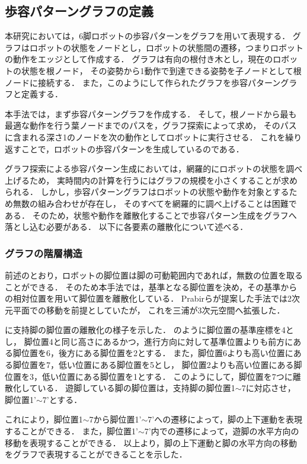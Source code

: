 \subsection{歩容パターングラフの定義}
本研究においては，6脚ロボットの歩容パターンをグラフを用いて表現する．
グラフはロボットの状態をノードとし，ロボットの状態間の遷移，つまりロボットの動作をエッジとして作成する．
グラフは有向の根付き木とし，現在のロボットの状態を根ノード，
その姿勢から1動作で到達できる姿勢を子ノードとして根ノードに接続する．
また，このようにして作られたグラフを歩容パターングラフと定義する．

本手法では，まず歩容パターングラフを作成する．
そして，根ノードから最も最適な動作を行う葉ノードまでのパスを，グラフ探索によって求め，
そのパスに含まれる深さ1のノードを次の動作としてロボットに実行させる．
これを繰り返すことで，ロボットの歩容パターンを生成しているのである．

グラフ探索による歩容パターン生成においては，網羅的にロボットの状態を調べ上げるため，
実時間内の計算を行うにはグラフの規模を小さくすることが求められる．
しかし，歩容パターングラフはロボットの状態や動作を対象とするため無数の組み合わせが存在し，
そのすべてを網羅的に調べ上げることは困難である．
そのため，状態や動作を離散化することで歩容パターン生成をグラフへ落とし込む必要がある．
以下に各要素の離散化について述べる．

\subsubsection{グラフの階層構造}
前述のとおり，ロボットの脚位置は脚の可動範囲内であれば，無数の位置を取ることができる．
そのため本手法では，基準となる脚位置を決め，その基準からの相対位置を用いて脚位置を離散化している．
Prabirらが提案した手法では2次元平面での移動を前提としていたが\cite{Prabir_Graph_search}，
これを三浦が3次元空間へ拡張した\cite{Miura_Graph_search}．

に支持脚の脚位置の離散化の様子を示した．
のように脚位置の基準座標を4とし，
脚位置4と同じ高さにあるかつ，進行方向に対して基準位置よりも前方にある脚位置を6，後方にある脚位置を2とする．
また，脚位置6よりも高い位置にある脚位置を7，低い位置にある脚位置を5とし，
脚位置2よりも高い位置にある脚位置を3，低い位置にある脚位置を1とする．
このようにして，脚位置を7つに離散化している．
遊脚している脚の脚位置は，支持脚の脚位置1$\sim$7に対応させ，脚位置1'$\sim$7'とする．%

これにより，脚位置1$\sim$7から脚位置1'$\sim$7'への遷移によって，脚の上下運動を表現することができる．
また，脚位置1'$\sim$7'内での遷移によって，遊脚の水平方向の移動を表現することができる．
以上より，脚の上下運動と脚の水平方向の移動をグラフで表現することができることを示した．

